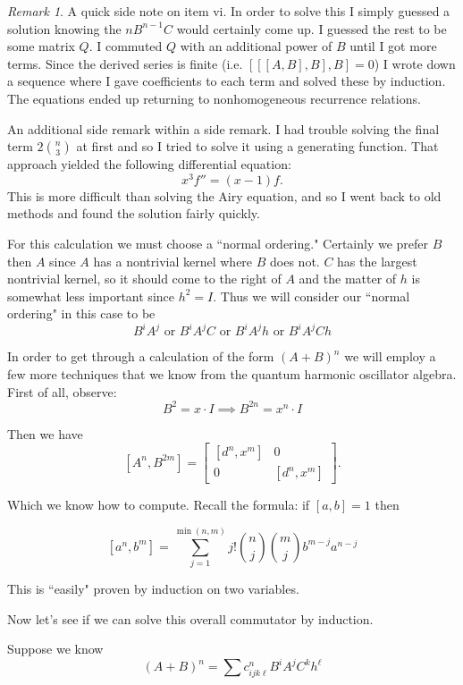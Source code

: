 \documentclass{amsart}
\theoremstyle{definition}
\theoremstyle{remark}
\newtheorem{rem}[thm]{Remark}
\numberwithin{equation}{section}
\begin{document}
\begin{rem}
A quick side note on item vi.  In order to solve this I simply guessed a solution knowing the $nB^{n-1}C$ would certainly come up.  I guessed the rest to be some matrix $Q$.  I commuted $Q$ with an additional power of $B$ until I got more terms.  Since the derived series is finite (i.e. $[[[A,B],B],B]=0$) I wrote down a sequence where I gave coefficients to each term and solved these by induction.  The equations ended up returning to nonhomogeneous recurrence relations.  

An additional side remark within a side remark.  I had trouble solving the final term $2\binom{n}{3}$ at first and so I tried to solve it using a generating function.  That approach yielded the following differential equation:
\[
x^3 f'' = (x-1)f.
\]
This is more difficult than solving the Airy equation, and so I went back to old methods and found the solution fairly quickly.

\end{rem}

For this calculation we must choose a ``normal ordering."  Certainly we prefer $B$ then $A$ since $A$ has a nontrivial kernel where $B$ does not.  $C$ has the largest nontrivial kernel, so it should come to the right of $A$ and the matter of $h$ is somewhat less important since $h^2=I$.  Thus we will consider our ``normal ordering" in this case to be
\[
B^i A^j \text{ or } B^i A^j C \text{ or } B^iA^jh \text{ or } B^iA^jCh
\]


In order to get through a calculation of the form $(A+B)^n$ we will employ a few more techniques that we know from the quantum harmonic oscillator algebra.  First of all, observe:
\[
B^2 = x\cdot I  \implies B^{2n} = x^n \cdot I
\]

Then we have
\[
[A^n,B^{2m}] = \begin{bmatrix}
[d^n,x^m] & 0 \\
0 & [d^n,x^m]
\end{bmatrix}.
\]

Which we know how to compute.  Recall the formula: if $[a,b]=1$ then

\[
[a^n,b^m] = \sum_{j=1}^{\min(n,m)} j!\binom{n}{j}\binom{m}{j}b^{m-j}a^{n-j}
\]

This is ``easily" proven by induction on two variables.


Now let's see if we can solve this overall commutator by induction.

Suppose we know
\[
(A+B)^n = \sum c^n_{ijk\ell} B^i A^j C^k h^{\ell}
\]
\end{document}
